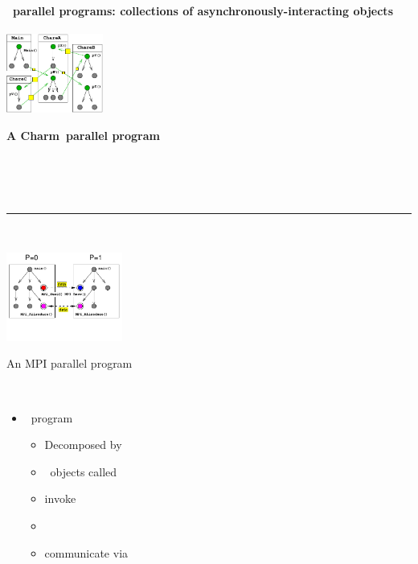 \begin{frame}[fragile]
\secframetitle{\ssCharm}
\framesubtitle{\charm\ parallel programs: collections of asynchronously-interacting objects}
\begin{minipage}[t]{1.75in}
\begin{center}
\begin{minipage}{1.25in}
\includegraphics[width=1.25in]{charm.pdf}
\ \\
\centerline{\scriptsize\textbf{A Charm\pp\ parallel program}}
\end{minipage}\\ \ \\
\ \\
\hrule
\ \\
\begin{minipage}{1.50in}
\includegraphics[width=1.50in]{mpi.pdf}\\
\vspace{-0.5in}
\centerline{\scriptsize{An MPI parallel program}}
\end{minipage}
\end{center}
\end{minipage} \ 
\begin{minipage}[t]{2.50in}
\vspace{-0.70in}
\begin{itemize}
\item \charm\ program
  \begin{itemize}
  \item Decomposed by 
  \item \charm\ objects called 
  \item invoke 
  \item {}
  \item communicate via 

\end{itemize}
\end{itemize}
\end{minipage}
\end{frame}
